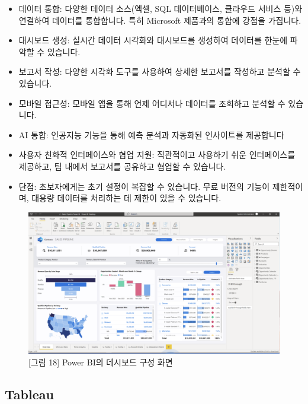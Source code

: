 \documentclass[
  letterpaper,
]{book}
\providecommand{\tightlist}{%
  \setlength{\itemsep}{0pt}\setlength{\parskip}{0pt}}\usepackage{longtable,booktabs,array}
\begin{document}
\begin{itemize}
\tightlist
\item
  데이터 통합: 다양한 데이터 소스(엑셀, SQL 데이터베이스, 클라우드
  서비스 등)와 연결하여 데이터를 통합합니다. 특히 Microsoft 제품과의
  통합에 강점을 가집니다.
\item
  대시보드 생성: 실시간 데이터 시각화와 대시보드를 생성하여 데이터를
  한눈에 파악할 수 있습니다.
\item
  보고서 작성: 다양한 시각화 도구를 사용하여 상세한 보고서를 작성하고
  분석할 수 있습니다.
\item
  모바일 접근성: 모바일 앱을 통해 언제 어디서나 데이터를 조회하고 분석할
  수 있습니다.
\item
  AI 통합: 인공지능 기능을 통해 예측 분석과 자동화된 인사이트를
  제공합니다
\item
  사용자 친화적 인터페이스와 협업 지원: 직관적이고 사용하기 쉬운
  인터페이스를 제공하고, 팀 내에서 보고서를 공유하고 협업할 수 있습니다.
\item
  단점: 초보자에게는 초기 설정이 복잡할 수 있습니다. 무료 버전의 기능이
  제한적이며, 대용량 데이터를 처리하는 데 제한이 있을 수 있습니다.
\end{itemize}

\begin{figure}[H]

{\centering \includegraphics{img/fig18.png}

}

\caption{{[}그림 18{]} Power BI의 데시보드 구성 화면}

\end{figure}%

\subsection{Tableau}\label{tableau}
\end{document}
